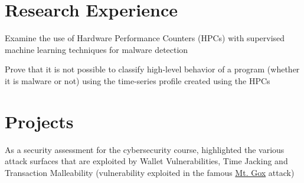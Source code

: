 \documentclass[]{deedy_format_Anmol}
\begin{document}
\begin{minipage}[t]{0.66\textwidth}

\section{Research Experience}
\vspace{\topsep} %
\vspace{1mm}
\justify
\begin{tightemize}
\item Examine the use of Hardware Performance Counters (HPCs) with supervised machine learning techniques for malware detection 
\item Prove that it is not possible to classify high-level behavior of a program (whether it is malware or not) using the time-series profile created using the HPCs
\end{tightemize}
\vspace{\topsep}
\sectionsep



\section{Projects}
\vspace{0.5mm} %

\vspace{1mm}
\justify
\begin{tightemize}
\item As a security assessment for the cybersecurity course, highlighted the various attack surfaces that are exploited by Wallet Vulnerabilities, Time Jacking and Transaction Malleability (vulnerability exploited in the famous \href{http://www.darkreading.com/attacks-and-breaches/mt-gox-bitcoin-meltdown-what-went-wrong/d/d-id/1114091}{Mt. Gox} attack)	
\end{tightemize}
\vspace{\topsep}
\sectionsep



\end{minipage}
\end{document}
